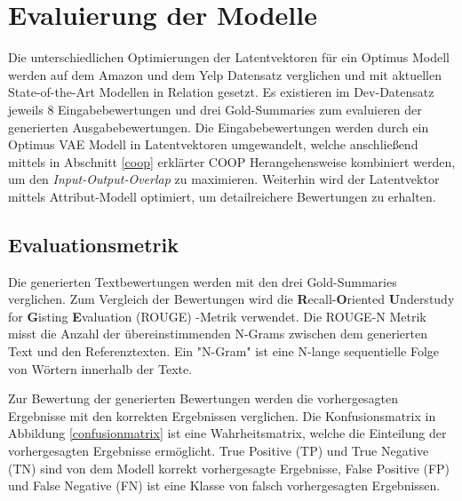 \section{Evaluierung der Modelle}\raggedbottom
Die unterschiedlichen Optimierungen der Latentvektoren für ein Optimus Modell werden auf dem Amazon und dem Yelp Datensatz verglichen und mit aktuellen State-of-the-Art Modellen in Relation gesetzt.
Es existieren im Dev-Datensatz jeweils 8 Eingabebewertungen und drei Gold-Summaries zum evaluieren der generierten Ausgabebewertungen.
Die Eingabebewertungen werden durch ein Optimus VAE Modell in Latentvektoren umgewandelt, welche anschließend mittels in Abschnitt \ref{coop} erklärter COOP Herangehensweise kombiniert werden, um den \textit{Input-Output-Overlap} zu maximieren. 
Weiterhin wird der Latentvektor mittels Attribut-Modell optimiert, um detailreichere Bewertungen zu erhalten.


\subsection{Evaluationsmetrik}
Die generierten Textbewertungen werden mit den drei Gold-Summaries verglichen.
Zum Vergleich der Bewertungen wird die \textbf{R}ecall-\textbf{O}riented \textbf{U}nderstudy for \textbf{G}isting \textbf{E}valuation (ROUGE) -Metrik verwendet.
Die ROUGE-N Metrik misst die Anzahl der übereinstimmenden N-Grams zwischen dem generierten Text und den Referenztexten. 
Ein "N-Gram" ist eine N-lange sequentielle Folge von Wörtern innerhalb der Texte. 

Zur Bewertung der generierten Bewertungen werden die vorhergesagten Ergebnisse mit den korrekten Ergebnissen verglichen. 
Die Konfusionsmatrix in Abbildung \ref{confusionmatrix} ist eine Wahrheitsmatrix, welche die Einteilung der vorhergesagten Ergebnisse ermöglicht. 
True Positive (TP) und True Negative (TN) sind von dem Modell korrekt vorhergesagte Ergebnisse, False Positive (FP) und False Negative (FN) ist eine Klasse von falsch vorhergesagten Ergebnissen.


